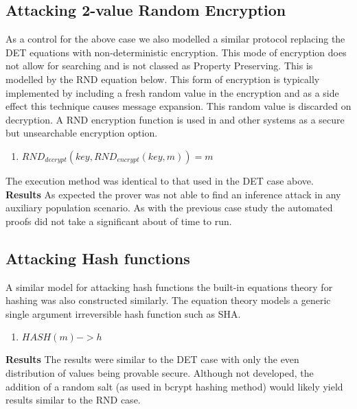 \documentclass[journal]{IEEEtran}
\begin{document}
\subsection{Attacking 2-value Random Encryption}
As a control for the above case we also modelled a similar protocol replacing the DET equations with non-deterministic encryption.
This mode of encryption does not allow for searching and is not classed as Property Preserving. This is modelled by the RND equation below. This form of encryption is typically implemented by including a fresh random value in the encryption and as a side effect this technique causes message expansion. This random value is discarded on decryption. A RND encryption function is used in \cite{Popa2011} and other systems as a secure but unsearchable encryption option.
\begin{enumerate}
    \item $RND_{decrypt}(key, RND_{encrypt}(key, m))=m$
\end{enumerate}
The execution method was identical to that used in the DET case above.\\
\textbf{Results} As expected the prover was not able to find an inference attack in any auxiliary population scenario. As with the previous case study the automated proofs did not take a significant about of time to run.

\subsection{Attacking Hash functions}
A similar model for attacking hash functions the built-in equations theory for hashing was also constructed similarly. The equation theory models a generic single argument irreversible hash function such as SHA. 
\begin{enumerate}
    \item $HASH(m) -> h$
\end{enumerate}
\textbf{Results} The results were similar to the DET case with only the even distribution of values being provable secure. Although not developed, the addition of a random salt (as used in bcrypt hashing method) would likely yield results similar to the RND case. 
\end{document}
